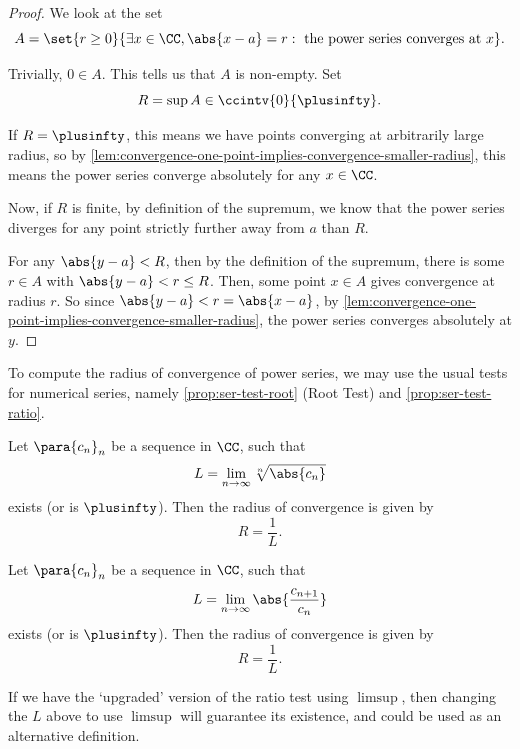 \begin{proof}
    We look at the set
    \[
        A = \set{r \geq 0}{\exists x \in \CC, \abs{x - a} = r: \text{ the power series converges at }x}.
    \]

    Trivially, \(0 \in A\). This tells us that \(A\) is non-empty. Set
    \[
        R = \sup A \in \ccintv{0}{\plusinfty}.
    \]

    If \(R = \plusinfty\), this means we have points converging at arbitrarily large radius, so by \autoref{lem:convergence-one-point-implies-convergence-smaller-radius}, this means the power series converge absolutely for any \(x \in \CC\).

    Now, if \(R\) is finite, by definition of the supremum, we know that the power series diverges for any point strictly further away from \(a\) than \(R\).
    
    For any \(\abs{y - a} < R\), then by the definition of the supremum, there is some \(r \in A\) with \(\abs{y - a} < r \leq R\). Then, some point \(x \in A\) gives convergence at radius \(r\). So since \(\abs{y - a} < r = \abs{x - a}\), by \autoref{lem:convergence-one-point-implies-convergence-smaller-radius}, the power series converges absolutely at \(y\).
\end{proof}

To compute the radius of convergence of power series, we may use the usual tests for numerical series, namely \autoref{prop:ser-test-root} (Root Test) and \autoref{prop:ser-test-ratio}.

\begin{proposition}
    \label{prop:power-series-test-root}%
    Let \(\para{c_n}_n\) be a sequence in \(\CC\), such that
    \[
        L = \lim_{n \to \infty} \sqrt[n]{\abs{c_n}}
    \]
    exists (or is \(\plusinfty\)). Then the radius of convergence is given by
    \[
        R = \frac{1}{L}.
    \]
\end{proposition}

\begin{proposition}
    \label{prop:power-series-test-ratio}%
    Let \(\para{c_n}_n\) be a sequence in \(\CC\), such that
    \[
        L = \lim_{n \to \infty} \abs{\frac{c_{n + 1}}{c_n}}
    \]
    exists (or is \(\plusinfty\)). Then the radius of convergence is given by
    \[
        R = \frac{1}{L}.
    \]
\end{proposition}

\begin{remark}
    If we have the `upgraded' version of the ratio test using \(\limsup\), then changing the \(L\) above to use \(\limsup\) will guarantee its existence, and could be used as an alternative definition.
\end{remark}

